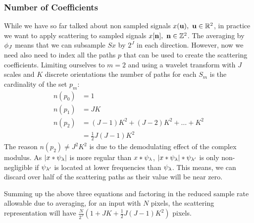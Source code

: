 \subsubsection{Number of Coefficients}
While we have so far talked about non sampled signals $x(\xy),\ \xy \in
\reals[2]$, in practice we want to apply scattering to sampled signals $x[\nn],\
\nn \in \integers[2]$. The averaging by $\phitd_J$ means that we can subsample
$Sx$ by $2^J$ in each direction. However, now we need also need to index all the
paths $p$ that can be used to create the scattering coefficients. Limiting
ourselves to $m=2$ and using a wavelet transform with $J$ scales and $K$
discrete orientations the number of paths for each $S_m$ is the cardinality of
the set $p_m$:
\begin{align}
  n(p_0) &= 1 \\
  n(p_1) &= JK \\
  n(p_2) &= (J-1)K^2 + (J-2)K^2 + \ldots + K^2 \\
         &= \frac{1}{2}J(J-1)K^2
\end{align}
The reason $n(p_2) \neq J^2 K^2$ is due to the demodulating effect of the
complex modulus. As $|x \conv \psitd_\lambda|$ is more regular than $x \conv
\psitd_\lambda$, $|x \conv \psitd_\lambda| \conv \psitd_{\lambda'}$ is only
non-negligible if $\psitd_{\lambda'}$ is located at lower frequencies than
$\psitd_\lambda$. This means, we can discard over half of the scattering paths as
their value will be near zero.

Summing up the above three equations and factoring in the reduced sample rate
allowable due to averaging, for an input with $N$ pixels, the scattering
representation will have $\frac{N}{2^J}\left(1+JK+\frac{1}{2}J(J-1)K^2 \right)$
pixels.

